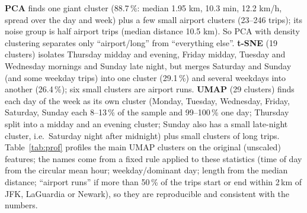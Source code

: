 \documentclass{article}
\begin{document}
\textbf{PCA} finds one giant cluster (88.7\,\%: median 1.95 km, 10.3 min, 12.2 km/h, spread over the day and week) plus a few small airport clusters (23--246 trips); its noise group is half airport trips (median distance 10.5 km). So PCA with density clustering separates only ``airport/long'' from ``everything else''. \textbf{t-SNE} (19 clusters) isolates Thursday midday and evening, Friday midday, Tuesday and Wednesday mornings and Sunday late night, but merges Saturday and Sunday (and some weekday trips) into one cluster (29.1\,\%) and several weekdays into another (26.4\,\%); six small clusters are airport runs. \textbf{UMAP} (29 clusters) finds each day of the week as its own cluster (Monday, Tuesday, Wednesday, Friday, Saturday, Sunday each 8--13\,\% of the sample and 99--100\,\% one day; Thursday split into a midday and an evening cluster; Sunday also has a small late-night cluster, i.e.\ Saturday night after midnight) plus small clusters of long trips. Table~\ref{tab:prof} profiles the main UMAP clusters on the original (unscaled) features; the names come from a fixed rule applied to these statistics (time of day from the circular mean hour; weekday/dominant day; length from the median distance; ``airport runs'' if more than 50\,\% of the trips start or end within 2\,km of JFK, LaGuardia or Newark), so they are reproducible and consistent with the numbers.
\end{document}
